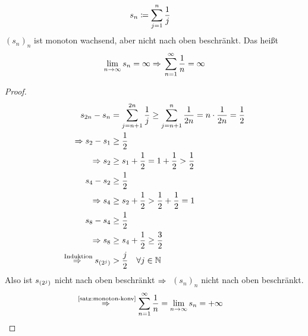 \begin{beispiel}
    \begin{align*}
        s_n &\coloneqq \sum_{j=1}^{n} \frac{1}{j}
    \end{align*}
    $(s_n)_n$ ist monoton wachsend, aber nicht nach oben beschränkt. Das heißt
    \begin{align*}
        \lim_{n\rightarrow{}\infty} s_n = \infty \Rightarrow{} \sum_{n=1}^{\infty} \frac{1}{n} = \infty
    \end{align*}

    \newpage

    \begin{proof}
        \begin{align*}
            s_{2n} - s_n &= \sum_{j=n+1}^{2n} \frac{1}{j} \geq \sum_{j=n+1}^{n} \frac{1}{2n} = n \cdot\frac{1}{2n} = \frac{1}{2}\\
            \Rightarrow{} s_2 - s_1 &\geq \frac{1}{2}\\
            \Rightarrow{} s_2 &\geq s_1 + \frac{1}{2} = 1 + \frac{1}{2} > \frac{1}{2}\\
            s_4 - s_2 &\geq \frac{1}{2}\\
            \Rightarrow{} s_4 &\geq s_2 + \frac{1}{2} > \frac{1}{2} + \frac{1}{2} = 1\\
            s_8 - s_4 &\geq \frac{1}{2}\\
            \Rightarrow{} s_8 &\geq s_4 + \frac{1}{2} \geq \frac{3}{2}\\
            \overset{\text{Induktion}}{\Rightarrow{}} s_{\left(2^j\right)} &> \frac{j}{2}\quad\forall j\in\mathbb{N}
        \end{align*}
        \noindent Also ist $s_{\left(2^j\right)}$ nicht nach oben beschränkt $\Rightarrow{}$ $(s_n)_n$ nicht nach oben beschränkt.
        \begin{align*}
            \overset{\text{\ref{satz:monoton-konv}}}{\Rightarrow{}} \sum_{n=1}^{\infty} \frac{1}{n} = \lim_{n\rightarrow{}\infty} s_n &= +\infty\qedhere
        \end{align*}
    \end{proof}
\end{beispiel}

